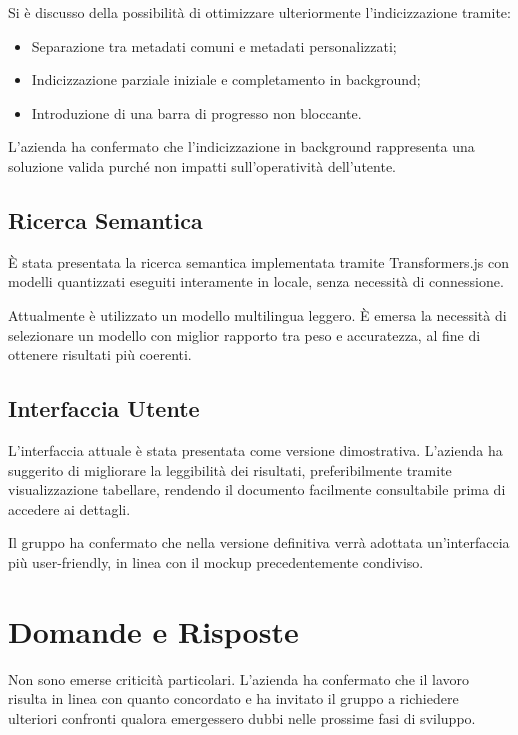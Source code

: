 \documentclass[a4paper,12pt]{article}
\begin{document}
Si è discusso della possibilità di ottimizzare ulteriormente l’indicizzazione tramite:
\begin{itemize}
    \item Separazione tra metadati comuni e metadati personalizzati;
    \item Indicizzazione parziale iniziale e completamento in background;
    \item Introduzione di una barra di progresso non bloccante.
\end{itemize}

L’azienda ha confermato che l’indicizzazione in background rappresenta una soluzione valida purché non impatti sull’operatività dell’utente.

\subsection{Ricerca Semantica}

È stata presentata la ricerca semantica implementata tramite Transformers.js con modelli quantizzati eseguiti interamente in locale, senza necessità di connessione.

Attualmente è utilizzato un modello multilingua leggero.  
È emersa la necessità di selezionare un modello con miglior rapporto tra peso e accuratezza, al fine di ottenere risultati più coerenti.

\subsection{Interfaccia Utente}

L’interfaccia attuale è stata presentata come versione dimostrativa.  
L’azienda ha suggerito di migliorare la leggibilità dei risultati, preferibilmente tramite visualizzazione tabellare, rendendo il documento facilmente consultabile prima di accedere ai dettagli.

Il gruppo ha confermato che nella versione definitiva verrà adottata un’interfaccia più user-friendly, in linea con il mockup precedentemente condiviso.

\section{Domande e Risposte}

Non sono emerse criticità particolari.  
L’azienda ha confermato che il lavoro risulta in linea con quanto concordato e ha invitato il gruppo a richiedere ulteriori confronti qualora emergessero dubbi nelle prossime fasi di sviluppo.
\end{document}
